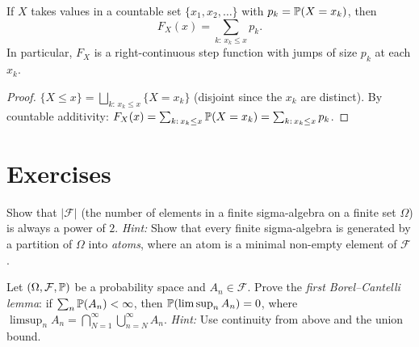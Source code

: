 \documentclass[11pt,a4paper]{article}
\begin{document}
\begin{proposition}
\label{prop:cdf_discrete}
If $X$ takes values in a countable set $\{x_1, x_2, \ldots\}$ with
$p_k = \mathbb{P}(X = x_k)$, then
\begin{equation}
  F_X(x) = \sum_{k:\, x_k \leq x} p_k.
  \label{eq:cdf_discrete}
\end{equation}
In particular, $F_X$ is a right-continuous step function with jumps of
size $p_k$ at each $x_k$.
\end{proposition}

\begin{proof}
$\{X \leq x\} = \bigsqcup_{k:\, x_k \leq x} \{X = x_k\}$ (disjoint
since the $x_k$ are distinct). By countable additivity:
$F_X(x) = \sum_{k:\, x_k \leq x} \mathbb{P}(X = x_k) = \sum_{k:\, x_k \leq x} p_k$.
\end{proof}


\section{Exercises}
\label{sec:exercises}

\begin{exercise}
\label{ex:sigma_finite}
Show that $|\mathcal{F}|$ (the number of elements in a finite
sigma-algebra on a finite set $\Omega$) is always a power of $2$.
\textit{Hint:} Show that every finite sigma-algebra is generated by a
partition of $\Omega$ into \emph{atoms}, where an atom is a minimal
non-empty element of $\mathcal{F}$.
\end{exercise}

\begin{exercise}
\label{ex:borel_cantelli}
Let $(\Omega, \mathcal{F}, \mathbb{P})$ be a probability space and
$A_n \in \mathcal{F}$. Prove the \emph{first Borel--Cantelli lemma}: if
$\sum_n \mathbb{P}(A_n) < \infty$, then
$\mathbb{P}(\limsup_n A_n) = 0$, where
$\limsup_n A_n = \bigcap_{N=1}^\infty \bigcup_{n=N}^\infty A_n$.
\textit{Hint:} Use continuity from above and the union bound.
\end{exercise}
\end{document}
